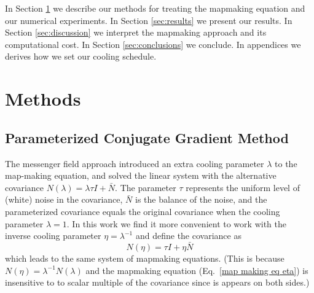\documentclass[twocolumn,linenumbers]{aastex631}
\DeclareMathOperator*{\argmin}{arg\,min}
\newcommand{\vbd}{\vb{d}}
\newcommand{\vbm}{\vb{m}}
\newcommand{\vbn}{\vb{n}}
\newcommand{\inv}[1]{#1^{-1}}
\newcommand{\hatm}{\vb{\hat{m}}}
\newcommand{\Pdagger}{P^{\dagger}}
\newcommand{\Nbar}{\bar{N}}
\newcommand{\PPinv}[1]{\inv{\qty(\Pdagger #1 P)}}
\begin{document}




In Section \ref{sec:methods} we describe our methods for treating the mapmaking equation and our numerical experiments.  In Section \ref{sec:results} we present our results. In Section \ref{sec:discussion} we interpret the mapmaking approach and its computational cost.  In Section \ref{sec:conclusions} we conclude.  In appendices we derives how we set our cooling schedule.


\section{Methods}\label{sec:methods}

\subsection{Parameterized Conjugate Gradient Method}
The messenger field approach introduced an extra cooling parameter $\lambda$ to the
map-making equation, and solved the linear system with the alternative covariance $N(\lambda) =  \lambda \tau I + \Nbar $.  The parameter $\tau$ represents the uniform level of (white) noise in the covariance, $\Nbar$ is the balance of the noise, and the parameterized covariance equals the original covariance when the cooling parameter $\lambda = 1$.  In this work we find it more convenient to work with the inverse cooling parameter $\eta = \lambda^{-1}$ and define the covariance as
\begin{equation}
  N(\eta) = \tau I +  \eta \Nbar 
\end{equation}
which leads to the same system of mapmaking equations.  (This is because $N(\eta) = \lambda^{-1} N(\lambda)$ and the mapmaking equation (Eq.~\ref{map making eq eta}) is insensitive to to scalar multiple of the covariance since is appears on both sides.)
\end{document}
